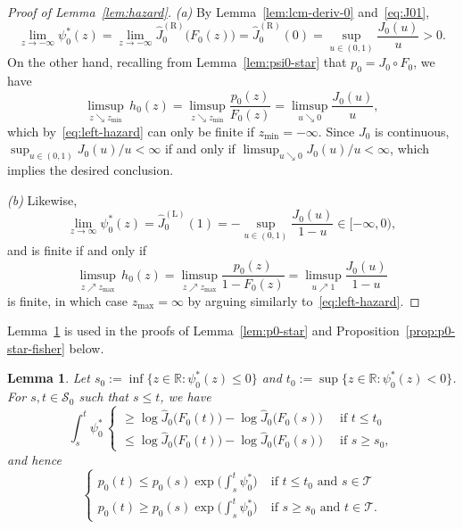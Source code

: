 \documentclass[a4paper]{article}
\newcommand{\R}{\mathbb{R}}
\newtheorem{lemma}[theorem]{Lemma}
\theoremstyle{definition}
\begin{document}
\begin{proof}[Proof of Lemma~\ref{lem:hazard}]
\textit{(a)} By Lemma~\ref{lem:lcm-deriv-0} and~\eqref{eq:J01},
\[
\lim_{z \to -\infty}\psi_0^*(z) = \lim_{z \to -\infty} \hat{J}_0^{(\mathrm{R})}\bigl(F_0(z)\bigr) = \hat{J}_0^{(\mathrm{R})}(0) = \sup_{u \in (0,1)}\frac{J_0(u)}{u} > 0.
\]
On the other hand, recalling from Lemma~\ref{lem:psi0-star} that $p_0 = J_0 \circ F_0$, we have
\[
\limsup_{z \searrow z_{\min}}\,h_0(z) = \limsup_{z \searrow z_{\min}}\frac{p_0(z)}{F_0(z)} = \limsup_{u \searrow 0}\frac{J_0(u)}{u},
\]
which by~\eqref{eq:left-hazard} can only be finite if $z_{\min} = -\infty$. Since $J_0$ is continuous, $\sup_{u \in (0,1)} J_0(u)/u < \infty$ if and only if $\limsup_{u \searrow 0} J_0(u)/u < \infty$, which implies the desired conclusion.

\medskip
\noindent
\textit{(b)} Likewise, 
\[
\lim_{z \to \infty}\psi_0^*(z) = \hat{J}_0^{(\mathrm{L})}(1) = -\sup_{u \in (0,1)}\frac{J_0(u)}{1 - u} \in [-\infty,0),
\]
and is finite if and only if
\[
\limsup_{z \nearrow z_{\max}}\,h_0(z) = \limsup_{z \nearrow z_{\max}}\frac{p_0(z)}{1 - F_0(z)} = \limsup_{u \nearrow 1}\frac{J_0(u)}{1 - u}
\]
is finite, in which case $z_{\max} = \infty$ by arguing similarly to~\eqref{eq:left-hazard}.
\end{proof}

Lemma~\ref{lem:p0-psi0-ineq} is used in the proofs of Lemma~\ref{lem:p0-star} and Proposition~\ref{prop:p0-star-fisher} below.

\begin{lemma}
\label{lem:p0-psi0-ineq}
Let $s_0 := \inf\{z \in \R : \psi_0^*(z) \leq 0\}$ and $t_0 := \sup\{z \in \R : \psi_0^*(z) < 0\}$. For $s,t \in \mathcal{S}_0$ such that $s \leq t$, we have
\begin{equation}
\label{eq:psi0-int-integral}
\int_s^t \psi_0^* \,
\begin{cases}
\geq \log\hat{J}_0\bigl(F_0(t)\bigr) - \log\hat{J}_0\bigl(F_0(s)\bigr) \;\;&\text{if }t \leq t_0 \\
\leq \log\hat{J}_0\bigl(F_0(t)\bigr) - \log\hat{J}_0\bigl(F_0(s)\bigr)  \;\;&\text{if }s \geq s_0,
\end{cases}
\end{equation}
and hence
\begin{equation}
\label{eq:p0-psi0-ineq}
\begin{cases}
p_0(t) \leq p_0(s)\exp\bigl(\int_s^t \psi_0^*\bigr) \;&\text{if }t \leq t_0 \text{ and }s \in \mathcal{T} \\
p_0(t) \geq p_0(s)\exp\bigl(\int_s^t \psi_0^*\bigr) \;&\text{if }s \geq s_0 \text{ and }t \in \mathcal{T}.
\end{cases}
\end{equation}
\end{lemma}
\end{document}
